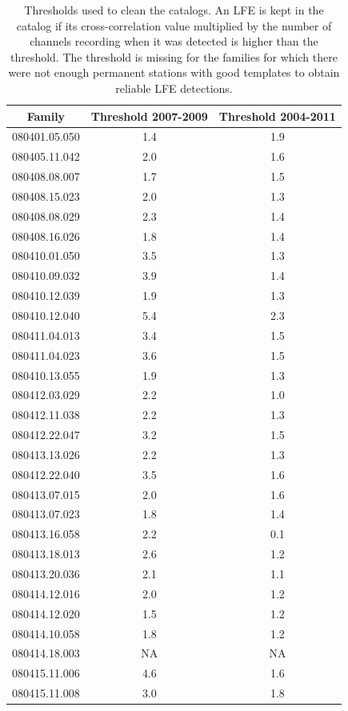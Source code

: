\documentclass[draft]{agujournal2019}
\begin{document}
\begin{table}[hbt!]
\caption{Thresholds used to clean the catalogs. An LFE is kept in the catalog if its cross-correlation value multiplied by the number of channels recording when it was detected is higher than the threshold. The threshold is missing for the families for which there were not enough permanent stations with good templates to obtain reliable LFE detections.}
\centering
\scriptsize
\begin{tabular}{c c c}
\hline
Family & Threshold 2007-2009 & Threshold 2004-2011 \\
\hline
080401.05.050 & 1.4 & 1.9 \\
080405.11.042 & 2.0 & 1.6 \\
080408.08.007 & 1.7 & 1.5 \\
080408.15.023 & 2.0 & 1.3 \\
080408.08.029 & 2.3 & 1.4 \\
080408.16.026 & 1.8 & 1.4 \\
080410.01.050 & 3.5 & 1.3 \\
080410.09.032 & 3.9 & 1.4 \\
080410.12.039 & 1.9 & 1.3 \\
080410.12.040 & 5.4 & 2.3 \\
080411.04.013 & 3.4 & 1.5 \\
080411.04.023 & 3.6 & 1.5 \\
080410.13.055 & 1.9 & 1.3 \\
080412.03.029 & 2.2 & 1.0 \\
080412.11.038 & 2.2 & 1.3 \\
080412.22.047 & 3.2 & 1.5 \\
080413.13.026 & 2.2 & 1.3 \\
080412.22.040 & 3.5 & 1.6 \\
080413.07.015 & 2.0 & 1.6 \\
080413.07.023 & 1.8 & 1.4 \\
080413.16.058 & 2.2 & 0.1 \\
080413.18.013 & 2.6 & 1.2 \\
080413.20.036 & 2.1 & 1.1 \\
080414.12.016 & 2.0 & 1.2 \\
080414.12.020 & 1.5 & 1.2 \\
080414.10.058 & 1.8 & 1.2 \\
080414.18.003 & NA & NA \\
080415.11.006 & 4.6 & 1.6 \\
080415.11.008 & 3.0 & 1.8 \\

\end{tabular}
\end{table}
\end{document}
